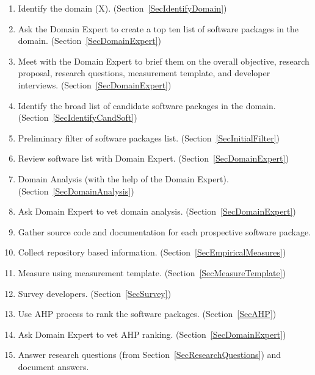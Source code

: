 \documentclass[letterpaper,cleveref]{lipics-v2019}
\newcommand{\authornote}[3]{\textcolor{#1}{[#3 ---#2]}}
\newcommand{\authornote}[3]{}
\newcommand{\wss}[1]{\authornote{blue}{SS}{#1}} %
\begin{document}
\begin{enumerate}
\item Identify the domain (X). (Section~\ref{SecIdentifyDomain})
\item Ask the Domain Expert to create a top ten list of software packages in the
  domain. (Section~\ref{SecDomainExpert})
\item Meet with the Domain Expert to brief them on the overall objective,
  research proposal, research questions, measurement template, and developer
  interviews. (Section~\ref{SecDomainExpert}) \label{StepMeeting}
\item Identify the broad list of candidate software packages in the domain.
  (Section~\ref{SecIdentifyCandSoft})
\item Preliminary filter of software packages list.
  (Section~\ref{SecInitialFilter})
\item Review software list with Domain Expert. (Section~\ref{SecDomainExpert})
\item Domain Analysis (with the help of the Domain Expert).
(Section~\ref{SecDomainAnalysis})
\item Ask Domain Expert to vet domain analysis.
  (Section~\ref{SecDomainExpert})
\item Gather source code and documentation for each prospective software
  package.
\item Collect repository based information. (Section~\ref{SecEmpiricalMeasures})
\item Measure using measurement template. (Section~\ref{SecMeasureTemplate})
\item Survey developers. (Section~\ref{SecSurvey})
\item Use AHP process to rank the software packages. (Section~\ref{SecAHP})
\item Ask Domain Expert to vet AHP ranking. (Section~\ref{SecDomainExpert})
\item Answer research questions (from Section~\ref{SecResearchQuestions}) and
document answers.
\end{enumerate}

\end{document}
